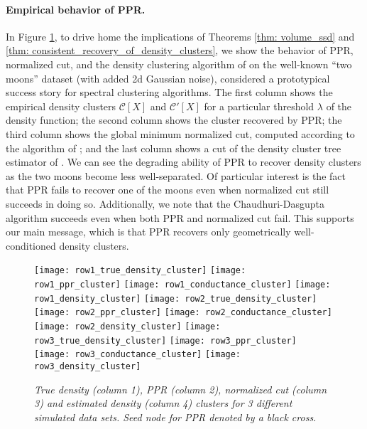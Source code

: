 \documentclass[11pt,twoside]{article}
\newcommand{\1}{\mathbbm{1}}
\newcommand{\Xbf}{X}
\newcommand{\Cset}{\mathcal{C}}
\begin{document}
\paragraph{Empirical behavior of PPR.} In Figure \ref{fig:moons}, to drive home 
the implications of Theorems \ref{thm: volume_ssd} and \ref{thm:
consistent_recovery_of_density_clusters}, we show the behavior of PPR,
normalized cut, and the density clustering algorithm of \citet{chaudhuri2010} on
the well-known ``two moons'' dataset (with added 2d Gaussian noise), considered
a prototypical success story for spectral clustering algorithms. The first
column shows the empirical density clusters $\Cset[\Xbf]$ and $\Cset'[\Xbf]$ for
a particular threshold $\lambda$ of the density function; the second column
shows the cluster recovered by PPR; the third column shows the global minimum
normalized cut, computed according to the algorithm of \citet{szlam2010}; and
the last column shows a cut of the density cluster tree estimator of
\citet{chaudhuri2010}.  We can see the degrading ability of PPR to recover
density clusters as the two moons become less well-separated. Of particular
interest is the fact that PPR fails to recover one of the moons even when
normalized cut still succeeds in doing so. Additionally, we note that the
Chaudhuri-Dasgupta algorithm succeeds even when both PPR and normalized cut
fail.  This supports our main message, which is that PPR recovers only
geometrically well-conditioned density clusters.

\begin{figure}
  \centering
  \texttt{[image: row1\_true\_density\_cluster]}
  \texttt{[image: row1\_ppr\_cluster]}
  \texttt{[image: row1\_conductance\_cluster]}
  \texttt{[image: row1\_density\_cluster]}
  \texttt{[image: row2\_true\_density\_cluster]}
  \texttt{[image: row2\_ppr\_cluster]}
  \texttt{[image: row2\_conductance\_cluster]}
  \texttt{[image: row2\_density\_cluster]}
  \texttt{[image: row3\_true\_density\_cluster]}
  \texttt{[image: row3\_ppr\_cluster]}
  \texttt{[image: row3\_conductance\_cluster]}
  \texttt{[image: row3\_density\_cluster]}
  \caption{\it\small True density (column 1), PPR (column 2), normalized
    cut (column 3) and estimated density (column 4) clusters for 3 different 
    simulated data sets. Seed node for PPR denoted by a black cross.} 
  \label{fig:moons}
\end{figure}
\end{document}
